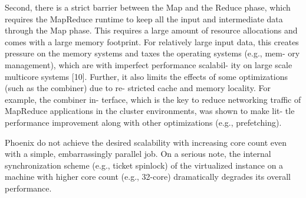 Second, there is a strict barrier between the Map and the Reduce
phase, which requires the MapReduce runtime to keep all the input
and intermediate data through the Map phase. This requires a large
amount of resource allocations and comes with a large memory
footprint. For relatively large input data, this creates pressure on
the memory systems and taxes the operating systems (e.g., mem-
ory management), which are with imperfect performance scalabil-
ity on large scale multicore systems [10]. Further, it also limits
the effects of some optimizations (such as the combiner) due to re-
stricted cache and memory locality. For example, the combiner in-
terface, which is the key to reduce networking traffic of MapReduce
applications in the cluster environments, was shown to make lit-
tle performance improvement along with other optimizations (e.g.,
prefetching).




Phoenix do not achieve the desired scalability with increasing core count 
even with a simple, embarrassingly parallel job.
On a serious note, the internal
synchronization scheme (e.g., ticket spinlock) of
the virtualized instance on a machine with higher core count (e.g.,
32-core) dramatically degrades its overall performance.
